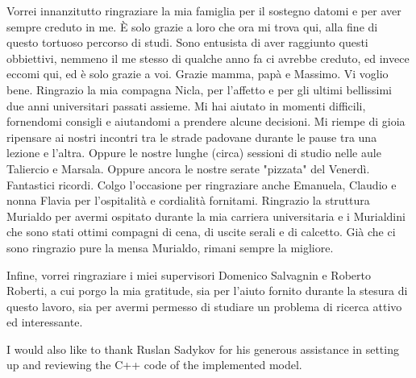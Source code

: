\vspace{1.0cm}
{
	\setlength\parindent{0pt}

	Vorrei innanzitutto ringraziare la mia famiglia per il sostegno datomi e per aver sempre creduto in me.
	È solo grazie a loro che ora mi trova qui, alla fine di questo tortuoso percorso di studi.
	Sono entusista di aver raggiunto questi obbiettivi, nemmeno il me stesso di qualche anno fa ci avrebbe creduto,
	ed invece eccomi qui, ed è solo grazie a voi.
	Grazie mamma, papà e Massimo.
	Vi voglio bene.
	Ringrazio la mia compagna Nicla, per l'affetto e per gli ultimi bellissimi due anni universitari passati assieme.
	Mi hai aiutato in momenti difficili, fornendomi consigli e aiutandomi a prendere alcune decisioni.
	Mi riempe di gioia ripensare ai nostri incontri tra le strade padovane durante le pause tra una lezione e l'altra.
	Oppure le nostre lunghe (circa) sessioni di studio nelle aule Taliercio e Marsala.
	Oppure ancora le nostre serate "pizzata" del Venerdì.
	Fantastici ricordi.
	Colgo l'occasione per ringraziare anche Emanuela, Claudio e nonna Flavia per l'ospitalità
	e cordialità fornitami.
	Ringrazio la struttura Murialdo per avermi ospitato durante la mia carriera universitaria e
	i Murialdini che sono stati ottimi compagni di cena, di uscite serali e di calcetto.
	Già che ci sono ringrazio pure la mensa Murialdo, rimani sempre la migliore.

	\medskip

	Infine, vorrei ringraziare i miei supervisori Domenico Salvagnin e Roberto Roberti,
	a cui porgo la mia gratitude, sia per l'aiuto fornito durante la stesura di questo lavoro,
	sia per avermi permesso di studiare un problema di ricerca attivo ed interessante.

	I would also like to thank Ruslan Sadykov for his generous assistance in setting up \bapcod{} and reviewing the C++ code of the implemented model.

}


\vspace{1cm}

{
	\setlength\parindent{0pt}

	\textit{\UnivPlace}\\
	\textit{\GraduationDate}    \hfill    \AuthorName{} \AuthorSurname{}
}
